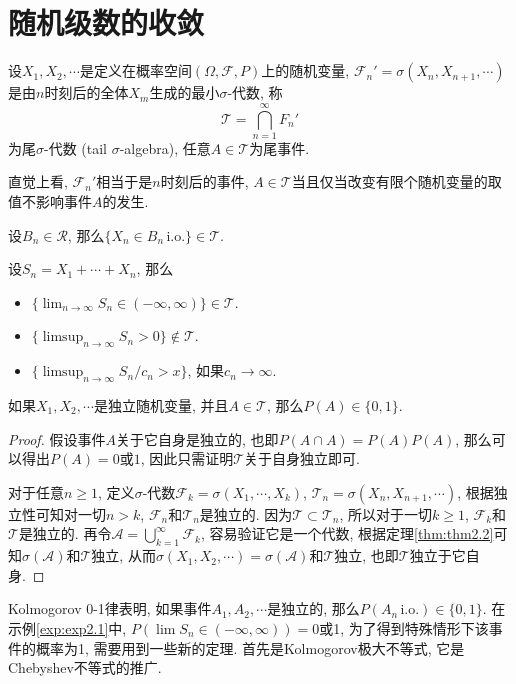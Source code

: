 \documentclass[cn, 12pt, math=mtpro2, bibstyle=apa, blue, twocol]{elegantbook}
\newcommand{\F}{\mathcal{F}}
\newcommand{\limn}{\lim_{n\to\infty}}
\begin{document}
\section{随机级数的收敛}
\begin{definition}
设$X_1,X_2,\cdots$是定义在概率空间$(\Omega,\F,P)$上的随机变量, $\F_n'=\sigma(X_{n},X_{n+1},\cdots)$是由$n$时刻后的全体$X_m$生成的最小$\sigma$-代数, 称
$$\mathcal{T}=\bigcap_{n=1}^\infty F_n'$$
为尾$\sigma$-代数 (tail $\sigma$-algebra), 任意$A\in\mathcal{T}$为尾事件.
\end{definition}
直觉上看, $\F_n'$相当于是$n$时刻后的事件, $A\in\mathcal{T}$当且仅当改变有限个随机变量的取值不影响事件$A$的发生.
\begin{example}
设$B_n\in\mathcal{R}$, 那么$\{X_n \in B_n\,\text{i.o.}\}\in\mathcal{T}$.
\end{example}
\begin{example}\label{exp:exp2.1}
设$S_n=X_1+\cdots+X_n$, 那么
\begin{itemize}
  \item $\{\limn S_n\in (-\infty,\infty)\}\in\mathcal{T}$.
  \item $\{\limsup_{n\to\infty} S_n>0\}\notin\mathcal{T}$.
  \item $\{\limsup_{n\to\infty} S_n/c_n>x\}$, 如果$c_n\to\infty$.
\end{itemize}
\end{example}
\begin{theorem}[Kolmogorov 0-1律]
  如果$X_1,X_2,\cdots$是独立随机变量, 并且$A\in\mathcal{T}$, 那么$P(A)\in \{0,1\}$.
\end{theorem}
\begin{proof}
假设事件$A$关于它自身是独立的, 也即$P(A\cap A)=P(A)P(A)$, 那么可以得出$P(A)=0$或$1$, 因此只需证明$\mathcal{T}$关于自身独立即可.

对于任意$n\geq1$, 定义$\sigma$-代数$\F_k=\sigma(X_1,\cdots,X_k)$, $\mathcal{T}_n=\sigma(X_{n},X_{n+1},\cdots)$, 根据独立性可知对一切$n>k$, $\F_n$和$\mathcal{T}_n$是独立的. 因为$\mathcal{T}\subset \mathcal{T}_n$, 所以对于一切$k\geq1$, $\F_k$和$\mathcal{T}$是独立的. 再令$\mathcal{A}=\bigcup_{k=1}^\infty \F_k$, 容易验证它是一个代数, 根据定理\ref{thm:thm2.2}可知$\sigma(\mathcal{A})$和$\mathcal{T}$独立, 从而$\sigma(X_1,X_2,\cdots)=\sigma(\mathcal{A})$和$\mathcal{T}$独立, 也即$\mathcal{T}$独立于它自身.

\end{proof}
Kolmogorov 0-1律表明, 如果事件$A_1,A_2,\cdots$是独立的, 那么$P(A_n\, \text{i.o.})\in\{0,1\}$. 在示例\ref{exp:exp2.1}中, $P(\lim S_n\in (-\infty,\infty))=0$或1, 为了得到特殊情形下该事件的概率为1, 需要用到一些新的定理. 首先是Kolmogorov极大不等式, 它是Chebyshev不等式的推广.
\end{document}
